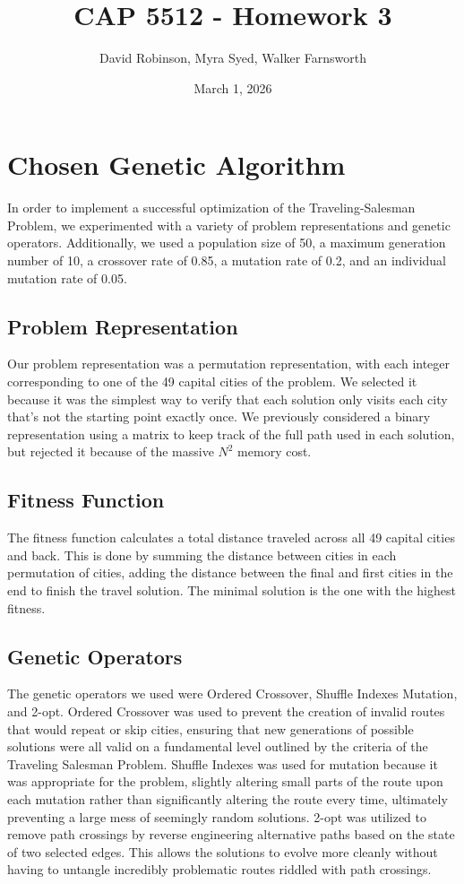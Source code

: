 \documentclass{article}
\title{CAP 5512 - Homework 3}
\author{David Robinson, Myra Syed, Walker Farnsworth}
\date{March 1, 2026}
\begin{document}
\maketitle

\section*{Chosen Genetic Algorithm}

In order to implement a successful optimization of the Traveling-Salesman Problem, we experimented with a variety of problem representations and genetic operators. Additionally, we used a population size of 50, a maximum generation number of 10, a crossover rate of 0.85, a mutation rate of 0.2, and an individual mutation rate of 0.05.

\subsection{Problem Representation}
Our problem representation was a permutation representation, with each integer corresponding to one of the 49 capital cities of the problem. We selected it because it was the simplest way to verify that each solution only visits each city that’s not the starting point exactly once. We previously considered a binary representation using a matrix to keep track of the full path used in each solution, but rejected it because of the massive $N^2$ memory cost.

\subsection{Fitness Function}
The fitness function calculates a total distance traveled across all 49 capital cities and back. This is done by summing the distance between cities in each permutation of cities, adding the distance between the final and first cities in the end to finish the travel solution. The minimal solution is the one with the highest fitness.

\subsection{Genetic Operators}
The genetic operators we used were Ordered Crossover, Shuffle Indexes Mutation, and 2-opt. Ordered Crossover was used to prevent the creation of invalid routes that would repeat or skip cities, ensuring that new generations of possible solutions were all valid on a fundamental level outlined by the criteria of the Traveling Salesman Problem. Shuffle Indexes was used for mutation because it was appropriate for the problem, slightly altering small parts of the route upon each mutation rather than significantly altering the route every time, ultimately preventing a large mess of seemingly random solutions. 2-opt was utilized to remove path crossings by reverse engineering alternative paths based on the state of two selected edges. This allows the solutions to evolve more cleanly without having to untangle incredibly problematic routes riddled with path crossings.
\end{document}
